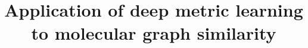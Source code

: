 \documentclass[doublespacing]{bmcart}
\begin{document}
\begin{frontmatter}

\begin{fmbox}


\title{Application of deep metric learning to molecular graph similarity}


\author[
  addressref={aff1},                   %
  corref={aff1},                       %
  email={damien.x.coupry@gsk.com}   %
]{ }

\author[
  addressref={aff1},
]{ }




\address[id=aff1]{%
  ,             %
  ,          %
  ,                              %
}




\end{fmbox}
\end{frontmatter}
\end{document}
